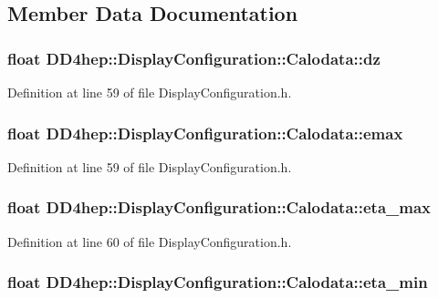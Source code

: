 \subsection{Member Data Documentation}
\hypertarget{struct_d_d4hep_1_1_display_configuration_1_1_calodata_add8df58585b1231290a12e7da2f2621f}{
\subsubsection[{dz}]{\setlength{\rightskip}{0pt plus 5cm}float {\bf DD4hep::DisplayConfiguration::Calodata::dz}}}
\label{struct_d_d4hep_1_1_display_configuration_1_1_calodata_add8df58585b1231290a12e7da2f2621f}


Definition at line 59 of file DisplayConfiguration.h.\hypertarget{struct_d_d4hep_1_1_display_configuration_1_1_calodata_a471e0a91b9b45ba9b9917e1ef6d0bba8}{
\subsubsection[{emax}]{\setlength{\rightskip}{0pt plus 5cm}float {\bf DD4hep::DisplayConfiguration::Calodata::emax}}}
\label{struct_d_d4hep_1_1_display_configuration_1_1_calodata_a471e0a91b9b45ba9b9917e1ef6d0bba8}


Definition at line 59 of file DisplayConfiguration.h.\hypertarget{struct_d_d4hep_1_1_display_configuration_1_1_calodata_ac4cd456a1e2d56e753b3c298f1c864b0}{
\subsubsection[{eta\_\-max}]{\setlength{\rightskip}{0pt plus 5cm}float {\bf DD4hep::DisplayConfiguration::Calodata::eta\_\-max}}}
\label{struct_d_d4hep_1_1_display_configuration_1_1_calodata_ac4cd456a1e2d56e753b3c298f1c864b0}


Definition at line 60 of file DisplayConfiguration.h.\hypertarget{struct_d_d4hep_1_1_display_configuration_1_1_calodata_a9a610caa053f259f21ee4051de9c7160}{
\subsubsection[{eta\_\-min}]{\setlength{\rightskip}{0pt plus 5cm}float {\bf DD4hep::DisplayConfiguration::Calodata::eta\_\-min}}}
\label{struct_d_d4hep_1_1_display_configuration_1_1_calodata_a9a610caa053f259f21ee4051de9c7160}


